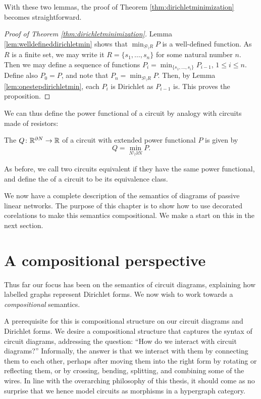 With these two lemmas, the proof of Theorem \ref{thm:dirichletminimization}
becomes straightforward.

\begin{proof}[Proof of Theorem \ref{thm:dirichletminimization}]
  Lemma \ref{lem:welldefineddirichletmin} shows that $\min_{S \setminus R}P$ is a well-defined
  function. As $R$ is a finite set, we may write it $R = \{s_1,\dots, s_n\}$ for
  some natural number $n$. Then we may define a sequence of functions $P_i =
  \min_{\{s_1, \dots,s_i\}} P_{i-1}$, $1 \le i\le n$. Define also $P_0 = P$, and note
  that $P_n = \min_{S \setminus R}P$. Then, by Lemma
  \ref{lem:onestepdirichletmin}, each $P_i$ is Dirichlet as $P_{i-1}$
  is. This proves the proposition.
\end{proof}

We can thus define the power functional of a circuit by analogy with circuits made
of resistors:

\begin{definition}
The  $Q {\colon} {\mathbb{R}}^{\partial N} \to {\mathbb{R}}$ of a circuit with extended power functional $P$ is given by
\[
 Q = \min_{N \setminus \partial N}  P .
\]
\end{definition}

As before, we call two circuits equivalent if they have the same power
functional, and define the  of a circuit to be its equivalence
class. 

We now have a complete description of the semantics of diagrams of passive
linear networks. The purpose of this chapter is to show how to use decorated
corelations to make this semantics compositional. We make a start on this in the
next section.


\section{A compositional perspective} \label{sec:circdef}
Thus far our focus has been on the semantics of circuit diagrams, explaining how
labelled graphs represent Dirichlet forms. We now wish to work towards a
\emph{compositional} semantics. 

A prerequisite for this is compositional structure on our circuit diagrams and
Dirichlet forms. We desire a compositional structure that captures the syntax of
circuit diagrams, addressing the question: ``How do we interact with circuit
diagrams?'' Informally, the answer is that we interact with them by connecting them
to each other, perhaps after moving them into the right form by rotating or
reflecting them, or by crossing, bending, splitting, and combining some of the
wires. In line with the overarching philosophy of this thesis, it should come as
no surprise that we hence model circuits as morphisms in a hypergraph category. 

